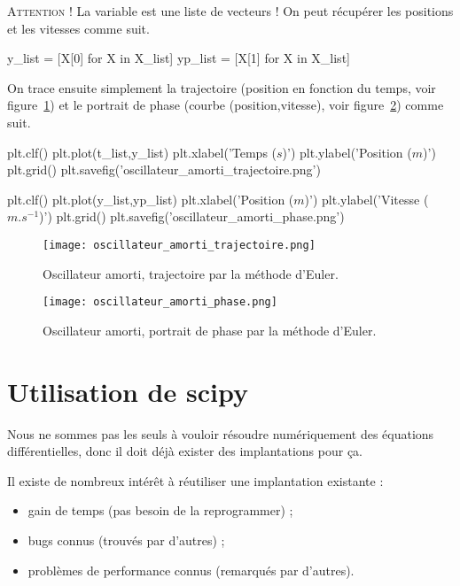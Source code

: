 \textsc{Attention !} La variable  est une liste de vecteurs ! On peut récupérer les positions et les vitesses comme suit. 

\begin{pyverbatim}
y_list = [X[0] for X in X_list]
yp_list = [X[1] for X in X_list]
\end{pyverbatim}

On trace ensuite simplement la trajectoire (position en fonction du temps, voir figure~\ref{11:fig:oscillateur_amorti_trajectoire}) et le portrait de phase (courbe (position,vitesse), voir figure~\ref{11:fig:oscillateur_amorti_phase}) comme suit. 
\begin{pyverbatim}
plt.clf()
plt.plot(t_list,y_list)
plt.xlabel('Temps ($s$)')
plt.ylabel('Position ($m$)')
plt.grid()
plt.savefig('oscillateur_amorti_trajectoire.png')

plt.clf()
plt.plot(y_list,yp_list)
plt.xlabel('Position ($m$)')
plt.ylabel('Vitesse ($m.s^{-1}$)')
plt.grid()
plt.savefig('oscillateur_amorti_phase.png')
\end{pyverbatim}
\begin{figure}[!h]
    \begin{center}
        \texttt{[image: oscillateur\_amorti\_trajectoire.png]}
        \caption{Oscillateur amorti, trajectoire par la méthode d'Euler.}
        \label{11:fig:oscillateur_amorti_trajectoire}
    \end{center}
\end{figure}
\begin{figure}[!h]
    \begin{center}
        \texttt{[image: oscillateur\_amorti\_phase.png]}
        \caption{Oscillateur amorti, portrait de phase par la méthode d'Euler.}
        \label{11:fig:oscillateur_amorti_phase}
    \end{center}
\end{figure}

\clearslide{}
\section{Utilisation de scipy}

Nous ne sommes pas les seuls à vouloir résoudre numériquement des
équations différentielles, donc il doit déjà exister des implantations
pour ça.

Il existe de nombreux intérêt à réutiliser une implantation existante :
\begin{itemize}
\item gain de temps (pas besoin de la reprogrammer) ;
\item bugs connus (trouvés par d'autres) ;
\item problèmes de performance connus (remarqués par d'autres).
\end{itemize}

